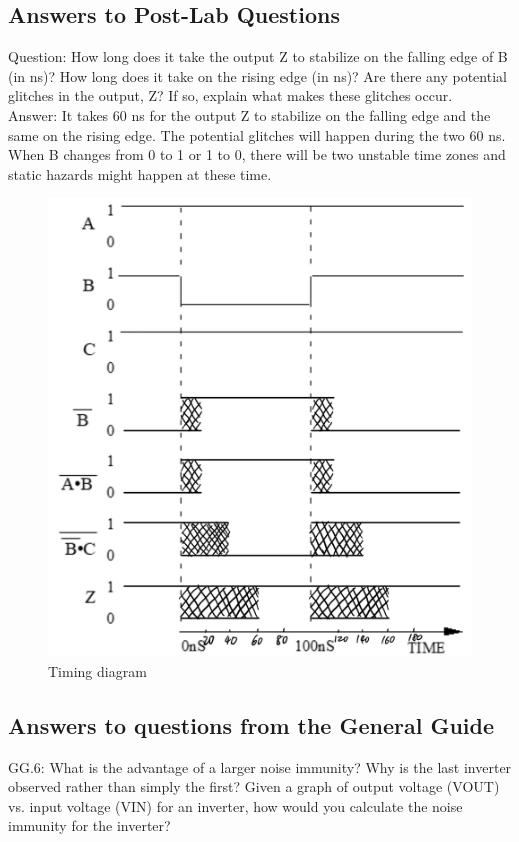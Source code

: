 \documentclass[12pt]{article}
\begin{document}
\subsection{\textbf{Answers to Post-Lab Questions}}
Question: How long does it take the output Z to stabilize on the falling edge of B (in ns)?  How long does it take on the rising edge (in ns)? Are there any potential glitches in the output, Z? If so, explain what makes these glitches occur. \\

\noindent
Answer: It takes 60 ns for the output Z to stabilize on the falling edge and the same on the rising edge. The potential glitches will happen during the two 60 ns. When B changes from 0 to 1 or 1 to 0, there will be two unstable time zones and static hazards might happen at these time.

\begin{figure}[H]
    \centering
    \includegraphics[scale=0.25]{timing_diagram.png}
    \caption{Timing diagram}
\end{figure}

\subsection{\textbf{Answers to questions from the General Guide}}
GG.6: What is the advantage of a larger noise immunity? Why is the last inverter
observed rather than simply the first? Given a graph of output voltage (VOUT) vs. input voltage (VIN) for an inverter, how would you calculate the noise immunity for the inverter? \\
\end{document}
